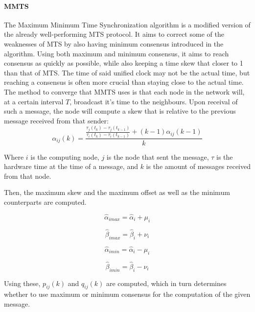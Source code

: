 \documentclass[a4paper,12pt]{article}
\begin{document}
    \paragraph{MMTS} The Maximum Minimum Time Synchronization algorithm is a modified version of the already well-performing MTS protocol. It aims to correct some of the weaknesses of MTS by also having minimum consensus introduced in the algorithm. Using both maximum and minimum consensus, it aims to reach consensus as quickly as possible, while also keeping a time skew that closer to 1 than that of MTS. The time of said unified clock may not be the actual time, but reaching a consensus is often more crucial than staying close to the actual time.
    The method to converge that MMTS uses is that each node in the network will, at a certain interval $T$, broadcast it's time to the neighbours. Upon receival of such a message, the node will compute a skew that is relative to the previous message received from that sender:
    \begin{equation}
        \alpha_{ij}(k) = \frac{\frac{\tau_j(t_k) - \tau_j(t_{k-1})}{\tau_i(t_k)-\tau_i(t_{k-1})} + (k-1)\alpha_{ij}(k-1)}{k}
    \end{equation}

    Where $i$ is the computing node, $j$ is the node that sent the message, $\tau$ is the hardware time at the time of a message, and $k$ is the amount of messages received from that node.
    
    Then, the maximum skew and the maximum offset as well as the minimum counterparts are computed.
    
    \begin{equation}
        \hat{\alpha}_{imax} = \hat{\alpha}_i + \mu_i
    \end{equation}
    
    \begin{equation}
        \hat{\beta}_{imax} = \hat{\beta}_i + \nu_i
    \end{equation}
    
    \begin{equation}
        \hat{\alpha}_{imin} = \hat{\alpha}_i - \mu_i
    \end{equation}
    
    \begin{equation}
        \hat{\beta}_{imin} = \hat{\beta}_i - \nu_i
    \end{equation}
    
    Using these, $p_{ij}(k)$ and $q_{ij}(k)$ are computed, which in turn determines whether to use maximum or minimum consensus for the computation of the given message.
    
\end{document}

